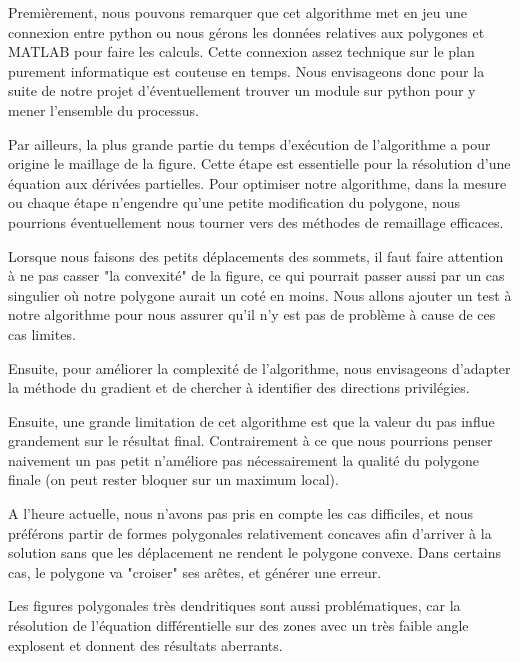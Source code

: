 \documentclass[a4paper,reqno]{article}
\newcommand{\pa}{\hspace{1cm}}
\begin{document}
\pa Premièrement, nous pouvons remarquer que cet algorithme met en jeu une connexion entre python ou nous gérons les données relatives aux polygones et MATLAB pour faire les calculs. Cette connexion assez technique sur le plan purement informatique est couteuse en temps. Nous envisageons donc pour la suite de notre projet d'éventuellement trouver un module sur python pour y mener l'ensemble du processus. \\
\par Par ailleurs, la plus grande partie du temps d'exécution de l'algorithme a pour origine le maillage de la figure. Cette étape est essentielle pour la résolution d'une équation aux dérivées partielles. Pour optimiser notre algorithme, dans la mesure ou chaque étape n'engendre qu'une petite modification du polygone, nous pourrions éventuellement nous tourner vers des méthodes de remaillage efficaces. \\
\par Lorsque nous faisons des petits déplacements des sommets, il faut faire attention à ne pas casser "la convexité" de la figure, ce qui pourrait passer aussi par un cas singulier où notre polygone aurait un coté en moins. Nous allons ajouter un test à notre algorithme pour nous assurer qu'il n'y est pas de problème à cause de ces cas limites. \\
\par Ensuite, pour améliorer la complexité de l'algorithme, nous envisageons d'adapter la méthode du gradient et de chercher à identifier des directions privilégies.\\
\par Ensuite, une grande limitation de cet algorithme est que la valeur du pas influe grandement sur le résultat final. Contrairement à ce que nous pourrions penser naivement un pas petit n'améliore pas nécessairement la qualité du polygone finale (on peut rester bloquer sur un maximum local).\\
\par A l'heure actuelle, nous n'avons pas pris en compte les cas difficiles, et nous préférons partir de formes polygonales relativement concaves afin d'arriver à la solution sans que les déplacement ne rendent le polygone convexe. Dans certains cas, le polygone va "croiser" ses arêtes, et générer une erreur. \\
\par Les figures polygonales très dendritiques sont aussi problématiques, car la résolution de l'équation différentielle sur des zones avec un très faible angle explosent et donnent des résultats aberrants. 
\end{document}
